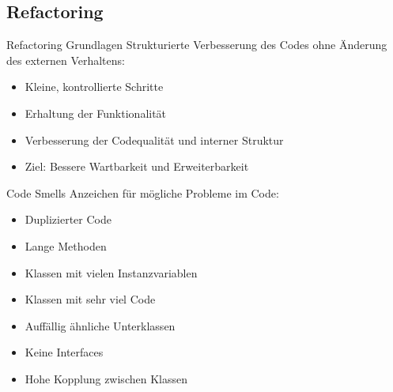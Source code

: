 \subsection{Refactoring}

\begin{definition}{Refactoring Grundlagen}
Strukturierte Verbesserung des Codes ohne Änderung des externen Verhaltens:
\begin{itemize}
    \item Kleine, kontrollierte Schritte
    \item Erhaltung der Funktionalität 
    \item Verbesserung der Codequalität und interner Struktur
    \item Ziel: Bessere Wartbarkeit und Erweiterbarkeit
\end{itemize}
\end{definition}

\begin{definition}{Code Smells}
Anzeichen für mögliche Probleme im Code:
\begin{itemize}
    \item Duplizierter Code
    \item Lange Methoden
    \item Klassen mit vielen Instanzvariablen
    \item Klassen mit sehr viel Code
    \item Auffällig ähnliche Unterklassen
    \item Keine Interfaces
    \item Hohe Kopplung zwischen Klassen
\end{itemize}
\end{definition}

